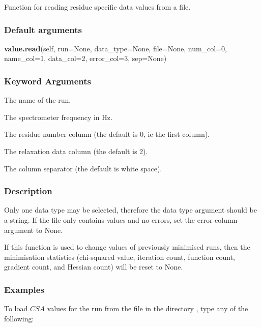 Function for reading residue specific data values from a file.

\subsubsection{Default arguments}

\textsf{\textbf{value.read}(self, run=None, data\_type=None, file=None, num\_col=0, name\_col=1, data\_col=2, error\_col=3, sep=None)}


\subsubsection{Keyword Arguments}

  The name of the run.

  The spectrometer frequency in Hz.

  The residue number column (the default is 0, ie the first column).

  The relaxation data column (the default is 2).

  The column separator (the default is white space).

\subsubsection{Description}

Only one data type may be selected, therefore the data type argument should be a string.  If
the file only contains values and no errors, set the error column argument to None.

If this function is used to change values of previously minimised runs, then the
minimisation statistics (chi-squared value, iteration count, function count, gradient count,
and Hessian count) will be reset to None.


\subsubsection{Examples}

To load $CSA$ values for the run 
 from the file 
 in the directory 
, type
any of the following:



